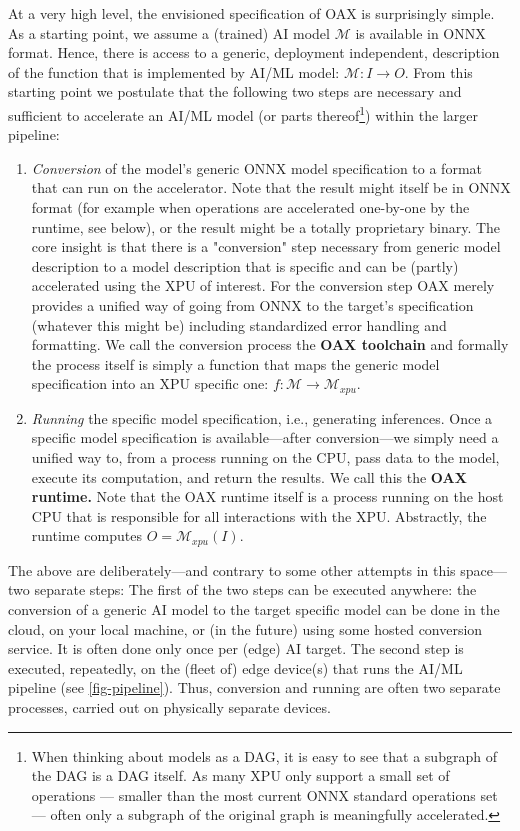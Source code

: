\documentclass{article}
\begin{document}
At a very high level, the envisioned specification of OAX is surprisingly simple. As a starting point, we assume a (trained) AI model $\mathcal{M}$ is available in ONNX format. Hence, there is access to a generic, deployment independent, description of the function that is implemented by AI/ML model: $\mathcal{M} \colon I \to O$.  From this starting point we postulate that  the following two steps are necessary and sufficient to accelerate an AI/ML model (or parts thereof\footnote{When thinking about models as a DAG, it is easy to see that a subgraph of the DAG is a DAG itself. As many XPU only support a small set of operations --- smaller than the most current ONNX standard operations set --- often only a subgraph of the original graph is meaningfully accelerated.}) within the larger pipeline:

\begin{enumerate}
\item \emph{Conversion} of the model's generic ONNX model specification to a format that can run on the accelerator. Note that the result might itself be in ONNX format (for example when operations are accelerated one-by-one by the runtime, see below), or the result might be a totally proprietary binary. The core insight is that there is a "conversion" step necessary from generic model description to a model description that is specific and can be (partly) accelerated using the XPU of interest. For the conversion step OAX merely provides a unified way of going from ONNX to the target's specification (whatever this might be) including standardized error handling and formatting. We call the conversion process the \textbf{OAX toolchain} and formally the process itself is simply a function that maps the generic model specification into an XPU specific one: $f \colon \mathcal{M} \to \mathcal{M}_{xpu}$. 
\item \emph{Running} the specific model specification, i.e., generating inferences. Once a specific model specification is available---after conversion---we simply need a unified way to, from a process running on the CPU, pass data to the model, execute its computation, and return the results. We call this the \textbf{OAX runtime.} Note that the OAX runtime itself is a process running on the host CPU that is responsible for all interactions with the XPU. Abstractly, the runtime computes $O = \mathcal{M}_{xpu}(I)$.
\end{enumerate}

The above are deliberately---and contrary to some other attempts in this space---two separate steps: The first of the two steps can be executed anywhere: the conversion of a generic AI model to the target specific model can be done in the cloud, on your local machine, or (in the future) using some hosted conversion service. It is often done only once per (edge) AI target. The second step is executed, repeatedly, on the (fleet of) edge device(s) that runs the AI/ML pipeline (see \ref{fig-pipeline}). Thus, conversion and running are often two separate processes, carried out on physically separate devices.
\end{document}
